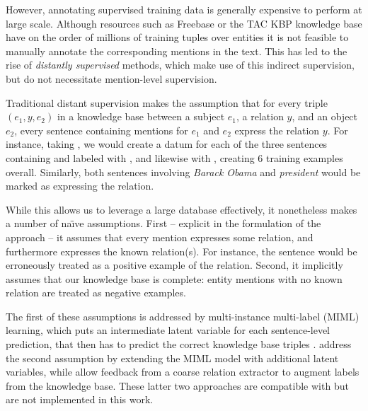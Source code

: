 However, annotating supervised training data is generally
  expensive to perform at large scale.
Although resources such as Freebase or the TAC KBP knowledge base
  have on the order of millions of training tuples over
  entities it is not feasible to manually annotate the 
  corresponding mentions in the text.
This has led to the rise of \textit{distantly supervised} methods, which
  make use of this indirect supervision, but do not
  necessitate mention-level supervision.



Traditional distant supervision makes the assumption that
  for every triple $(e_1, y, e_2)$ in a knowledge base between
  a subject $e_1$, a relation $y$, and an object $e_2$, every sentence
  containing mentions for $e_1$ and $e_2$ express the relation $y$.
For instance, taking , we would create a datum for each
  of the three sentences containing  and 
  labeled with , and likewise with
  , creating 6 training examples overall.
Similarly, both sentences involving \textit{Barack Obama} and
  \textit{president} would be marked as expressing the 
  relation.

While this allows us to leverage a large database effectively, it
  nonetheless makes a number of na\"{\i}ve assumptions.
First -- explicit in the formulation of the approach -- it assumes that every
  mention expresses some relation,
  and furthermore expresses the known relation(s).
For instance, the sentence  would be erroneously
  treated as a positive example of the  relation.
Second, it implicitly assumes that our knowledge base is complete:
  entity mentions with no known relation are treated as negative examples.

The first of these assumptions is addressed by
  multi-instance multi-label (MIML) learning, which puts an intermediate latent variable
  for each sentence-level prediction, that then has to predict the correct knowledge base
  triples \cite{key:2012surdeanu-mimlre}.
 address the second assumption by extending the
  MIML model with additional latent variables, while 
  allow feedback from a coarse relation extractor to augment labels from the knowledge base.
These latter two approaches are compatible with but are 
  not implemented in this work.



